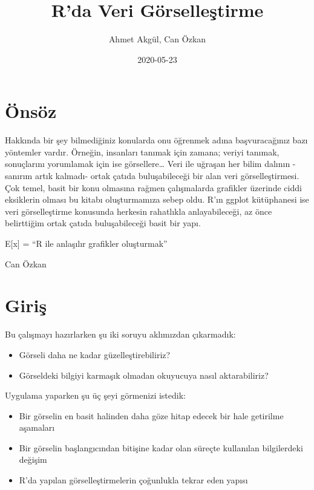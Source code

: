 \documentclass[
]{book}
\title{R'da Veri Görselleştirme}
\author{Ahmet Akgül, Can Özkan}
\date{2020-05-23}
\begin{document}
\maketitle

{
\setcounter{tocdepth}{1}
\tableofcontents
}
\hypertarget{uxf6nsuxf6z}{%
\chapter{Önsöz}\label{uxf6nsuxf6z}}

Hakkında bir şey bilmediğiniz konularda onu öğrenmek adına başvuracağınız bazı yöntemler vardır. Örneğin, insanları tanımak için zamana; veriyi tanımak, sonuçlarını yorumlamak için ise görsellere\ldots{} Veri ile uğraşan her bilim dalının -sanırım artık kalmadı- ortak çatıda buluşabileceği bir alan veri görselleştirmesi. Çok temel, basit bir konu olmasına rağmen çalışmalarda grafikler üzerinde ciddi eksiklerin olması bu kitabı oluşturmamıza sebep oldu. R'ın ggplot kütüphanesi ise veri görselleştirme konusunda herkesin rahatlıkla anlayabileceği, az önce belirttiğim ortak çatıda buluşabileceği basit bir yapı.

E{[}x{]} = ``R ile anlaşılır grafikler oluşturmak''

Can Özkan

\hypertarget{giriux15f}{%
\chapter{Giriş}\label{giriux15f}}

Bu çalışmayı hazırlarken şu iki soruyu aklımızdan çıkarmadık:

\begin{itemize}
\item
  Görseli daha ne kadar güzelleştirebiliriz?
\item
  Görseldeki bilgiyi karmaşık olmadan okuyucuya nasıl aktarabiliriz?
\end{itemize}

Uygulama yaparken şu üç şeyi görmenizi istedik:

\begin{itemize}
\item
  Bir görselin en basit halinden daha göze hitap edecek bir hale getirilme aşamaları
\item
  Bir görselin başlangıcından bitişine kadar olan süreçte kullanılan bilgilerdeki değişim
\item
  R'da yapılan görselleştirmelerin çoğunlukla tekrar eden yapısı
\end{itemize}
\end{document}
